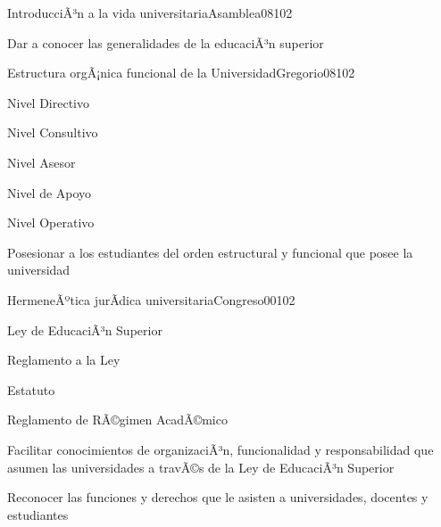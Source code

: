 \begin{syllabus}
\begin{unit}{IntroducciÃ³n a la vida universitaria}{Asamblea08}{10}{2}
   \begin{unitgoals}
      \item Dar a conocer las generalidades de la educaciÃ³n superior
   \end{unitgoals}
\end{unit}

\begin{unit}{Estructura orgÃ¡nica funcional de la Universidad}{Gregorio08}{10}{2}
   \begin{topics}
        \item Nivel Directivo
	\item Nivel Consultivo
	\item Nivel Asesor
	\item Nivel de Apoyo
	\item Nivel Operativo
  \end{topics}

   \begin{unitgoals}
      \item Posesionar a los estudiantes del orden estructural y funcional que posee la universidad
   \end{unitgoals}
\end{unit}

\begin{unit}{HermeneÃºtica jurÃ­dica universitaria}{Congreso00}{10}{2}
   \begin{topics}
        \item Ley de EducaciÃ³n Superior 
	\item Reglamento a la Ley
	\item Estatuto
	\item Reglamento de RÃ©gimen AcadÃ©mico
   \end{topics}

   \begin{unitgoals}
      \item Facilitar conocimientos de organizaciÃ³n, funcionalidad y responsabilidad que asumen las universidades a travÃ©s de la Ley de EducaciÃ³n Superior
      \item Reconocer las funciones y derechos que le asisten a universidades, docentes y estudiantes
   \end{unitgoals}
\end{unit}

\begin{learning-strategies}
\FGLearningStrategies
\end{learning-strategies}

\begin{evaluation}
\FGEvaluation
\end{evaluation}


\end{syllabus}
